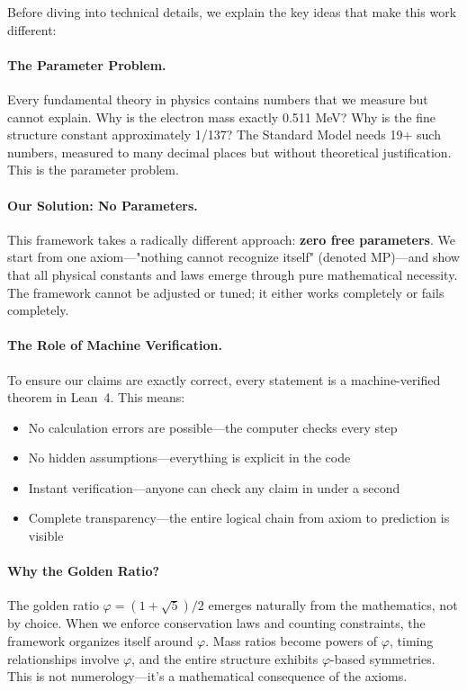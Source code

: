 \documentclass[11pt,a4paper,twoside]{article}
\numberwithin{equation}{section}
\theoremstyle{customthm}
\theoremstyle{customdef}
\theoremstyle{customrem}
\begin{document}
Before diving into technical details, we explain the key ideas that make this work different:

\paragraph{The Parameter Problem.} Every fundamental theory in physics contains numbers that we measure but cannot explain. Why is the electron mass exactly 0.511 MeV? Why is the fine structure constant approximately 1/137? The Standard Model needs 19+ such numbers, measured to many decimal places but without theoretical justification. This is the parameter problem.

\paragraph{Our Solution: No Parameters.} This framework takes a radically different approach: \textbf{zero free parameters}. We start from one axiom—"nothing cannot recognize itself" (denoted MP)—and show that all physical constants and laws emerge through pure mathematical necessity. The framework cannot be adjusted or tuned; it either works completely or fails completely.

\paragraph{The Role of Machine Verification.} To ensure our claims are exactly correct, every statement is a machine-verified theorem in Lean~4. This means:
\begin{itemize}[leftmargin=*,topsep=2pt,itemsep=2pt]
\item No calculation errors are possible—the computer checks every step
\item No hidden assumptions—everything is explicit in the code  
\item Instant verification—anyone can check any claim in under a second
\item Complete transparency—the entire logical chain from axiom to prediction is visible
\end{itemize}

\paragraph{Why the Golden Ratio?} The golden ratio $\varphi = (1+\sqrt{5})/2$ emerges naturally from the mathematics, not by choice. When we enforce conservation laws and counting constraints, the framework organizes itself around $\varphi$. Mass ratios become powers of $\varphi$, timing relationships involve $\varphi$, and the entire structure exhibits $\varphi$-based symmetries. This is not numerology—it's a mathematical consequence of the axioms.
\end{document}
